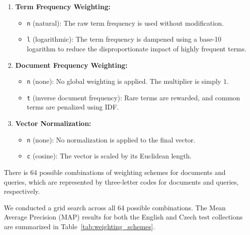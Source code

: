 \documentclass[a4paper, 12pt]{article}
\begin{document}
\begin{enumerate}
    \item \textbf{Term Frequency Weighting:}
    \begin{itemize}
        \item \texttt{n} (natural): The raw term frequency is used without modification.
        \item \texttt{l} (logarithmic): The term frequency is dampened using a base-10 logarithm to reduce the disproportionate impact of highly frequent terms. 
    \end{itemize}

    \item \textbf{Document Frequency Weighting:}
    \begin{itemize}
        \item \texttt{n} (none): No global weighting is applied. The multiplier is simply $1$.
        \item \texttt{t} (inverse document frequency): Rare terms are rewarded, and common terms are penalized using IDF.
    \end{itemize}

    \item \textbf{Vector Normalization:}
    \begin{itemize}
        \item \texttt{n} (none): No normalization is applied to the final vector.
        \item \texttt{c} (cosine): The vector is scaled by its Euclidean length.
    \end{itemize}
\end{enumerate}

There is 64 possible combinations of weighting schemes for documents and queries, which are represented by three-letter codes for documents and queries, respectively.

We conducted a grid search across all 64 possible combinations. The Mean Average Precision (MAP) results for both the English and Czech test collections are summarized in Table~\ref{tab:weighting_schemes}.
\end{document}
